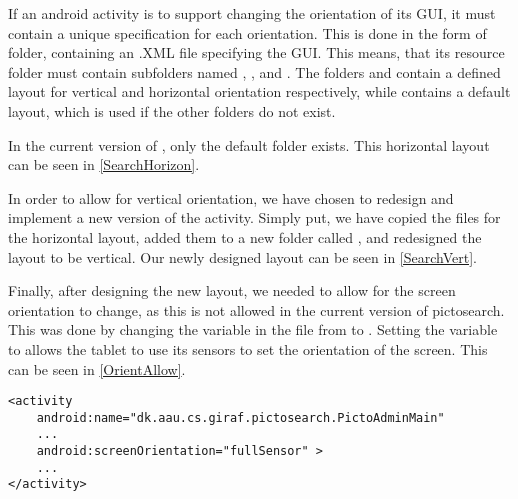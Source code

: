 If an android activity is to support changing the orientation of its GUI, it
must contain a unique specification for each orientation. This is done in the
form of folder, containing an .XML file specifying the GUI. This means, that its
resource folder  must contain subfolders named ,
, and . The folders 
and  contain a defined layout for vertical and horizontal
orientation respectively, while  contains a default layout, which
is used if the other folders do not exist.\nl

In the current version of , only the default folder
 exists. This horizontal layout can be seen in
\autoref{SearchHorizon}.

    
In order to allow for vertical orientation, we have chosen to redesign and
implement a new version of the activity. Simply put, we have copied the files
for the horizontal layout, added them to a new folder called
, and redesigned the layout to be vertical. Our newly
designed layout can be seen in \autoref{SearchVert}.


Finally, after designing the new layout, we needed to allow for the screen
orientation to change, as this is not allowed in the current version of
pictosearch. This was done by changing the 
variable in the  file from  to
. Setting the variable to  allows the tablet
to use its sensors to set the orientation of the screen. This can be seen in
\autoref{OrientAllow}.\nl

\begin{minipage}[H]{\linewidth}
\begin{lstlisting}[caption = Allowing changes to the screen orientation., label = OrientAllow] 
<activity
	android:name="dk.aau.cs.giraf.pictosearch.PictoAdminMain"
    ...
    android:screenOrientation="fullSensor" >
    ...
</activity>
\end{lstlisting}
\end{minipage}


